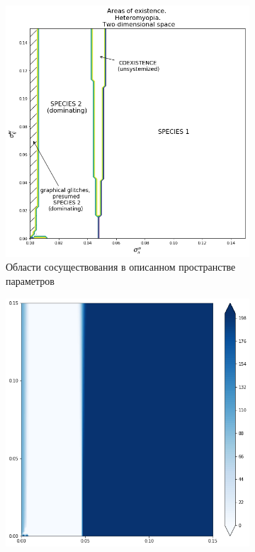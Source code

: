 \begin{figure}[ht]
\begin{subfigure}{.5\textwidth}
		\includegraphics[width=.93\linewidth]{arhm08d2.png}
		\caption{Области сосуществования в описанном пространстве параметров}
		\label{fig:hmd2:sub2}
	\end{subfigure}
\begin{subfigure}{.5\textwidth}
	\centering
	\includegraphics[width=.93\linewidth]{hm_d2_n1.png}

\end{subfigure}
\end{figure}
